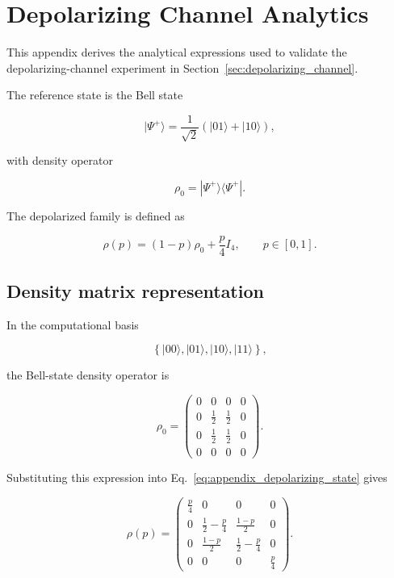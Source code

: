 
\section{Depolarizing Channel Analytics}
\label{app:depolarizing_channel_derivations}

This appendix derives the analytical expressions used to validate the depolarizing-channel experiment in Section~\ref{sec:depolarizing_channel}.

The reference state is the Bell state

\[
|\Psi^+\rangle
=
\frac{1}{\sqrt{2}}
\left(
|01\rangle + |10\rangle
\right),
\]

with density operator

\[
\rho_0
=
|\Psi^+\rangle
\langle\Psi^+|.
\]

The depolarized family is defined as

\begin{equation}
\rho(p)
=
(1-p)\rho_0
+
\frac{p}{4}I_4,
\qquad
p \in [0,1].
\label{eq:appendix_depolarizing_state}
\end{equation}


\subsection*{Density matrix representation}

In the computational basis

\[
\left\{
|00\rangle,
|01\rangle,
|10\rangle,
|11\rangle
\right\},
\]

the Bell-state density operator is

\[
\rho_0
=
\begin{pmatrix}
0 & 0 & 0 & 0 \\
0 & \frac{1}{2} & \frac{1}{2} & 0 \\
0 & \frac{1}{2} & \frac{1}{2} & 0 \\
0 & 0 & 0 & 0
\end{pmatrix}.
\]

Substituting this expression into Eq.~\eqref{eq:appendix_depolarizing_state} gives

\[
\rho(p)
=
\begin{pmatrix}
\frac{p}{4} & 0 & 0 & 0 \\
0 & \frac{1}{2}-\frac{p}{4} & \frac{1-p}{2} & 0 \\
0 & \frac{1-p}{2} & \frac{1}{2}-\frac{p}{4} & 0 \\
0 & 0 & 0 & \frac{p}{4}
\end{pmatrix}.
\]

